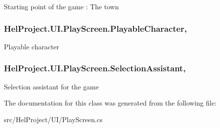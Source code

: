 Starting point of the game \+: The town 

\hypertarget{class_hel_project_1_1_u_i_1_1_play_screen_a404ed230e991ee3a7563c23fc053f383}{}
\subsubsection[{Playable\+Character}]{ Hel\+Project.\+U\+I.\+Play\+Screen.\+Playable\+Character\hspace{0.3cm}{\ttfamily [get]}, {\ttfamily [set]}}\label{class_hel_project_1_1_u_i_1_1_play_screen_a404ed230e991ee3a7563c23fc053f383}


Playable character 

\hypertarget{class_hel_project_1_1_u_i_1_1_play_screen_a06addd08f18e59b70cded27e325a6ed1}{}
\subsubsection[{Selection\+Assistant}]{ Hel\+Project.\+U\+I.\+Play\+Screen.\+Selection\+Assistant\hspace{0.3cm}{\ttfamily [get]}, {\ttfamily [set]}}\label{class_hel_project_1_1_u_i_1_1_play_screen_a06addd08f18e59b70cded27e325a6ed1}


Selection assistant for the game 



The documentation for this class was generated from the following file\+:\begin{DoxyCompactItemize}
\item 
src/\+Hel\+Project/\+U\+I/Play\+Screen.\+cs\end{DoxyCompactItemize}
